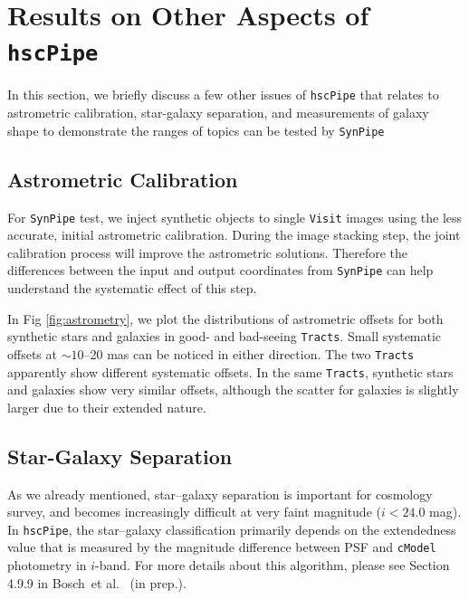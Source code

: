 \documentclass[useamsfonts]{pasj01}
\def\etal{{\ et al.~}}
\def\hscpipe{\texttt{hscPipe}}
\def\synpipe{\texttt{SynPipe}}
\def\cmodel{\texttt{cModel}}
\def\visit{\texttt{Visit}}
\def\tracts{\texttt{Tracts}}
\begin{document}

\section{Results on Other Aspects of \hscpipe{}}
    \label{sec:others}

    In this section, we briefly discuss a few other issues of \hscpipe{} that relates 
    to astrometric calibration, star-galaxy separation, and measurements of galaxy 
    shape to demonstrate the ranges of topics can be tested by \synpipe{}
    
\subsection{Astrometric Calibration}
    \label{ssec:astrometry}
    
    For \synpipe{} test, we inject synthetic objects to single \visit{} images using 
    the less accurate, initial astrometric calibration. 
    During the image stacking step, the joint calibration process will improve the 
    astrometric solutions. 
    Therefore the differences between the input and output coordinates from \synpipe{}
    can help understand the systematic effect of this step. 
    
    In Fig \ref{fig:astrometry}, we plot the distributions of astrometric offsets for 
    both synthetic stars and galaxies in good- and bad-seeing \tracts{}. 
    Small systematic offsets at ${\sim}10$--20 mas can be noticed in either direction. 
    The two \tracts{} apparently show different systematic offsets. 
    In the same \tracts{}, synthetic stars and galaxies show very similar offsets, 
    although the scatter for galaxies is slightly larger due to their extended nature.
    
\subsection{Star-Galaxy Separation}
    \label{ssec:sg}
    
    As we already mentioned, star--galaxy separation is important for cosmology survey,
    and becomes increasingly difficult at very faint magnitude ($i<24.0$ mag). 
    In \hscpipe{}, the star--galaxy classification primarily depends on the extendedness 
    value that is measured by the magnitude difference between PSF and \cmodel{} 
    photometry in $i$-band. 
    For more details about this algorithm, please see Section 4.9.9 in Bosch\etal 
    (in prep.). 
    
\end{document}
